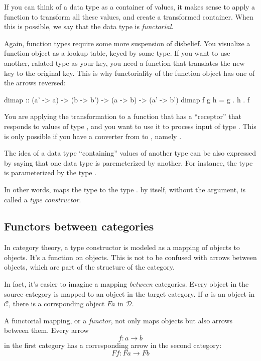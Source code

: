 \documentclass[DaoFP]{subfiles}
\begin{document}
If you can think of a data type as a container of values, it makes sense to apply a function to transform all these values, and create a transformed container. When this is possible, we say that the data type is \emph{functorial}. 

Again, function types require some more suspension of disbelief. You visualize a function object as a lookup table, keyed by some type. If you want to use another, ralated type as your key, you need a function that translates the new key to the original key. This is why functoriality of the function object has one of the arrows reversed:
\begin{haskell}
dimap :: (a' -> a) -> (b -> b') -> (a -> b) -> (a' -> b')
dimap f g h = g . h . f
\end{haskell}
You are applying the transformation to a function  that has a ``receptor'' that responds to values of type , and you want to use it to process input of type . This is only possible if you have a converter from  to , namely .


The idea of a data type ``containing'' values of another type can be also expressed by saying that one data type is paremeterized by another. For instance, the type  is parameterized by the type . 

In other words,  maps the type  to the type .  by itself, without the argument, is called a \emph{type constructor}. 

\subsection{Functors between categories}
In category theory, a type constructor is modeled as a mapping of objects to objects. It's a function on objects. This is not to be confused with arrows between objects, which are part of the structure of the category. 

In fact, it's easier to imagine a mapping \emph{between} categories. Every object in the source category is mapped to an object in the target category. If $a$ is an object in $\mathcal{C}$, there is a corrsponding object $F a$ in $\mathcal{D}$.

A functorial mapping, or a \emph{functor}, not only maps objects but also arrows between them. Every arrow 
\[ f \colon a \to b\]
in the first category has a corresponding arrow in the second category:
\[ F f \colon F a \to F b\]
\end{document}
